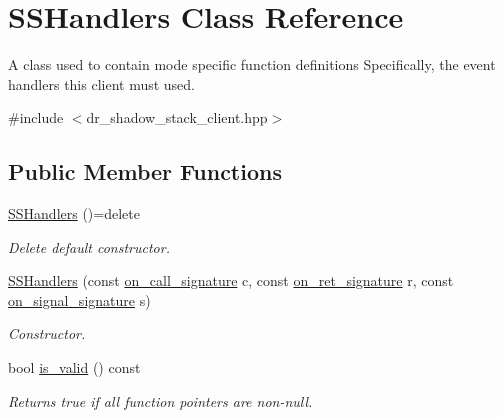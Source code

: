 \hypertarget{class_s_s_handlers}{\section{S\-S\-Handlers Class Reference}
\label{class_s_s_handlers}
}


A class used to contain mode specific function definitions Specifically, the event handlers this client must used.  




{\ttfamily \#include $<$dr\-\_\-shadow\-\_\-stack\-\_\-client.\-hpp$>$}

\subsection*{Public Member Functions}
\begin{DoxyCompactItemize}
\item 
\hyperlink{class_s_s_handlers_aa6983716a948c14c3bd9de8449b418fc}{S\-S\-Handlers} ()=delete
\begin{DoxyCompactList}\small\item\em Delete default constructor. \end{DoxyCompactList}\item 
\hyperlink{class_s_s_handlers_a58d41cd44d4d7a9eb32592ec7b387024}{S\-S\-Handlers} (const \hyperlink{class_s_s_handlers_a7dfce2bdabde106253c02c2c012c1ea1}{on\-\_\-call\-\_\-signature} c, const \hyperlink{class_s_s_handlers_ac88de91ef7a6133f1836e4e7413ee5a1}{on\-\_\-ret\-\_\-signature} r, const \hyperlink{class_s_s_handlers_ad3cf1de404b14193c28b3247f6a88d73}{on\-\_\-signal\-\_\-signature} s)
\begin{DoxyCompactList}\small\item\em Constructor. \end{DoxyCompactList}\item 
bool \hyperlink{class_s_s_handlers_a606e6f053258d57bfb5bfc9b175c3641}{is\-\_\-valid} () const 
\begin{DoxyCompactList}\small\item\em Returns true if all function pointers are non-\/null. \end{DoxyCompactList}\end{DoxyCompactItemize}
